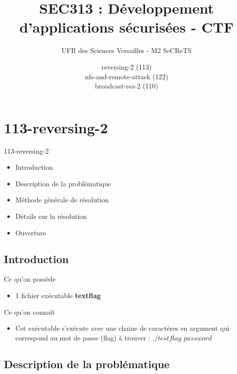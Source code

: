 \documentclass{beamer}
\title{SEC313 : Développement d'applications sécurisées - CTF}
\author{UFR des Sciences Versailles - M2 SeCReTS}
\institute{AYOUB Pierre \& CAUMES Clément \& \\ DEBROUASSE Kevin \& Mehdi MTALSI-MERIMI}
\date{reversing-2 (113) \\ nfs-and-remote-attack (122) \\ broadcast-rsa-2 (110)}
\begin{document}
  \begin{frame}
  \titlepage
  \end{frame}

\section{113-reversing-2}

\begin{frame}
\begin{block}{113-reversing-2}
	\begin{itemize}
		[circle]
		\item Introduction
		\item Description de la problématique
		\item Méthode générale de résolution
		\item Détails sur la résolution
		\item Ouverture
	\end{itemize}
\end{block}
\end{frame}

\subsection{Introduction}

\begin{frame}

\begin{block}{Ce qu'on possède} 
\begin{itemize}
	[circle]
	\item 1 fichier exécutable \textbf{textflag}
\end{itemize}
\end{block}

\begin{block}{Ce qu'on connaît} 
\begin{itemize}
	[circle]
	\item Cet exécutable s'exécute avec une chaine de caractères en argument qui correspond au mot de passe (flag) à trouver : $./testflag$ $password$
\end{itemize}
\end{block}

\end{frame}

\subsection{Description de la problématique}
\end{document}
